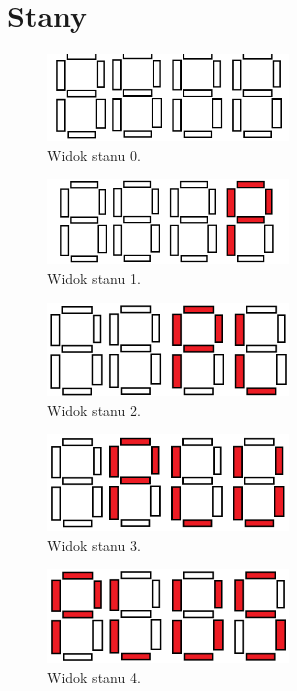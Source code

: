 \documentclass[]{article}
\begin{document}
\section{Stany}
\begin{figure}[H]
	\centering
	\includegraphics[width=0.57\textwidth]{stan0.png}
	\caption{Widok stanu 0.}
\end{figure}
\begin{figure}[H]
	\centering
	\includegraphics[width=0.57\textwidth]{stan1.png}
	\caption{Widok stanu 1.}
\end{figure}
\begin{figure}[H]
	\centering
	\includegraphics[width=0.57\textwidth]{stan2.png}
	\caption{Widok stanu 2.}
\end{figure}
\begin{figure}[H]
	\centering
	\includegraphics[width=0.57\textwidth]{stan3.png}
	\caption{Widok stanu 3.}
\end{figure}
\begin{figure}[H]
	\centering
	\includegraphics[width=0.57\textwidth]{stan4.png}
	\caption{Widok stanu 4.}
\end{figure}
\end{document}
